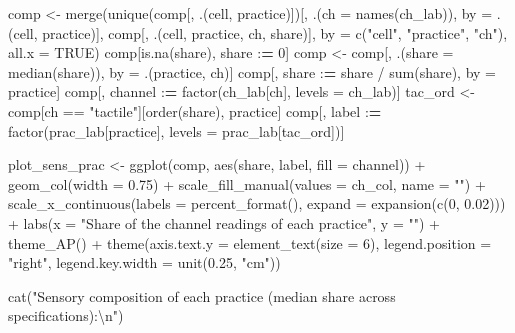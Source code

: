 \documentclass[
  11pt,
]{article}
\newenvironment{Shaded}{\begin{snugshade}}{\end{snugshade}}
\newcommand{\AttributeTok}[1]{\textcolor[rgb]{0.77,0.63,0.00}{#1}}
\newcommand{\ConstantTok}[1]{\textcolor[rgb]{0.00,0.00,0.00}{#1}}
\newcommand{\DecValTok}[1]{\textcolor[rgb]{0.00,0.00,0.81}{#1}}
\newcommand{\ErrorTok}[1]{\textcolor[rgb]{0.64,0.00,0.00}{\textbf{#1}}}
\newcommand{\FloatTok}[1]{\textcolor[rgb]{0.00,0.00,0.81}{#1}}
\newcommand{\FunctionTok}[1]{\textcolor[rgb]{0.00,0.00,0.00}{#1}}
\newcommand{\NormalTok}[1]{#1}
\newcommand{\OtherTok}[1]{\textcolor[rgb]{0.56,0.35,0.01}{#1}}
\newcommand{\SpecialCharTok}[1]{\textcolor[rgb]{0.00,0.00,0.00}{#1}}
\newcommand{\StringTok}[1]{\textcolor[rgb]{0.31,0.60,0.02}{#1}}
\begin{document}
\begin{Shaded}
\begin{Highlighting}[]
\NormalTok{comp }\OtherTok{\textless{}{-}} \FunctionTok{merge}\NormalTok{(}\FunctionTok{unique}\NormalTok{(comp[, .(cell, practice)])[, .(}\AttributeTok{ch =} \FunctionTok{names}\NormalTok{(ch\_lab)),}
                                                 \AttributeTok{by =}\NormalTok{ .(cell, practice)],}
\NormalTok{              comp[, .(cell, practice, ch, share)],}
              \AttributeTok{by =} \FunctionTok{c}\NormalTok{(}\StringTok{"cell"}\NormalTok{, }\StringTok{"practice"}\NormalTok{, }\StringTok{"ch"}\NormalTok{), }\AttributeTok{all.x =} \ConstantTok{TRUE}\NormalTok{)}
\NormalTok{comp[}\FunctionTok{is.na}\NormalTok{(share), share }\SpecialCharTok{:}\ErrorTok{=} \DecValTok{0}\NormalTok{]}
\NormalTok{comp }\OtherTok{\textless{}{-}}\NormalTok{ comp[, .(}\AttributeTok{share =} \FunctionTok{median}\NormalTok{(share)), by }\OtherTok{=}\NormalTok{ .(practice, ch)]}
\NormalTok{comp[, share }\SpecialCharTok{:}\ErrorTok{=}\NormalTok{ share }\SpecialCharTok{/} \FunctionTok{sum}\NormalTok{(share), by }\OtherTok{=}\NormalTok{ practice]}
\NormalTok{comp[, channel }\SpecialCharTok{:}\ErrorTok{=} \FunctionTok{factor}\NormalTok{(ch\_lab[ch], }\AttributeTok{levels =}\NormalTok{ ch\_lab)]}
\NormalTok{tac\_ord }\OtherTok{\textless{}{-}}\NormalTok{ comp[ch }\SpecialCharTok{==} \StringTok{"tactile"}\NormalTok{][}\FunctionTok{order}\NormalTok{(share), practice]}
\NormalTok{comp[, label }\SpecialCharTok{:}\ErrorTok{=} \FunctionTok{factor}\NormalTok{(prac\_lab[practice], }\AttributeTok{levels =}\NormalTok{ prac\_lab[tac\_ord])]}

\NormalTok{plot\_sens\_prac }\OtherTok{\textless{}{-}} \FunctionTok{ggplot}\NormalTok{(comp, }\FunctionTok{aes}\NormalTok{(share, label, }\AttributeTok{fill =}\NormalTok{ channel)) }\SpecialCharTok{+}
  \FunctionTok{geom\_col}\NormalTok{(}\AttributeTok{width =} \FloatTok{0.75}\NormalTok{) }\SpecialCharTok{+}
  \FunctionTok{scale\_fill\_manual}\NormalTok{(}\AttributeTok{values =}\NormalTok{ ch\_col, }\AttributeTok{name =} \StringTok{""}\NormalTok{) }\SpecialCharTok{+}
  \FunctionTok{scale\_x\_continuous}\NormalTok{(}\AttributeTok{labels =} \FunctionTok{percent\_format}\NormalTok{(),}
                     \AttributeTok{expand =} \FunctionTok{expansion}\NormalTok{(}\FunctionTok{c}\NormalTok{(}\DecValTok{0}\NormalTok{, }\FloatTok{0.02}\NormalTok{))) }\SpecialCharTok{+}
  \FunctionTok{labs}\NormalTok{(}\AttributeTok{x =} \StringTok{"Share of the channel readings of each practice"}\NormalTok{, }\AttributeTok{y =} \StringTok{""}\NormalTok{) }\SpecialCharTok{+}
  \FunctionTok{theme\_AP}\NormalTok{() }\SpecialCharTok{+}
  \FunctionTok{theme}\NormalTok{(}\AttributeTok{axis.text.y =} \FunctionTok{element\_text}\NormalTok{(}\AttributeTok{size =} \DecValTok{6}\NormalTok{), }\AttributeTok{legend.position =} \StringTok{"right"}\NormalTok{,}
        \AttributeTok{legend.key.width =} \FunctionTok{unit}\NormalTok{(}\FloatTok{0.25}\NormalTok{, }\StringTok{"cm"}\NormalTok{))}

\FunctionTok{cat}\NormalTok{(}\StringTok{"Sensory composition of each practice (median share across specifications):}\SpecialCharTok{\textbackslash{}n}\StringTok{"}\NormalTok{)}
\end{Highlighting}
\end{Shaded}
\end{document}
